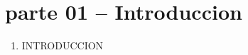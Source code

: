 \section{parte 01 – Introduccion} 

\begin{enumerate}[1.]
	\item INTRODUCCION
	
	
	

\end{enumerate} 
